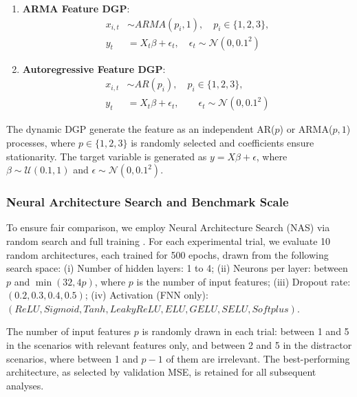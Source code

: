 \documentclass[preprint,12pt,authoryear]{sn-jnl}
\begin{document}
\begin{enumerate}

\item \textbf{ARMA Feature DGP}: 
\begin{equation}
\begin{split}
x_{i,t} &\sim ARMA(p_i,1), \quad p_i \in \{1,2,3\}, \\
y_t &= X_t \beta + \epsilon_t, \quad \epsilon_t \sim \mathcal{N}(0,0.1^2)
\end{split}
\end{equation}

    \item \textbf{Autoregressive Feature DGP}: 
\begin{equation}
\begin{split}
x_{i,t} &\sim AR(p_i), \quad p_i \in \{1,2,3\}, \\
y_t &= X_t \beta + \epsilon_t, 
\quad     \quad \epsilon_t \sim \mathcal{N}(0,0.1^2)
\end{split}
\end{equation}

\end{enumerate}

The dynamic DGP generate the feature as an independent AR($p$) or ARMA($p,1$) processes, where $p \in \{1,2,3\}$ is randomly selected and coefficients ensure stationarity. The target variable is generated as $y = X\beta + \epsilon$, where $\beta \sim \mathcal{U}(0.1,1)$ and $\epsilon \sim \mathcal{N}(0,0.1^2)$.

\subsubsection{Neural Architecture Search and Benchmark Scale}
To ensure fair comparison, we employ Neural Architecture Search (NAS) via random search and full training \citep{salmani2025systematic}. For each experimental trial, we evaluate 10 random architectures, each trained for 500 epochs, drawn from the following search space: (i) Number of hidden layers: 1 to 4; (ii) Neurons per layer: between $p$ and $\min(32, 4p)$, where $p$ is the number of input features; (iii) Dropout rate: $(0.2, 0.3, 0.4, 0.5)$; (iv) Activation (FNN only): $(ReLU, Sigmoid, Tanh, LeakyReLU, ELU, GELU, SELU, Softplus)$.

The number of input features $p$ is randomly drawn in each trial: between 1 and 5 in the scenarios with relevant features only, and between 2 and 5 in the distractor scenarios, where between 1 and $p-1$ of them are irrelevant. The best-performing architecture, as selected by validation MSE, is retained for all subsequent analyses.
\end{document}
